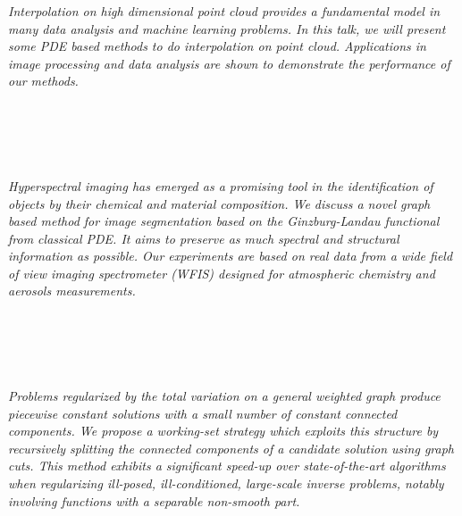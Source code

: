 \begin{multicols}{2}
\\ 
        \\
        \\\\
\\
      \textit{Interpolation on high dimensional point cloud provides a fundamental model in many data analysis and machine learning problems. In this talk, we will present some PDE based methods to do interpolation on point cloud. Applications in image processing and data analysis are shown to demonstrate the performance of our methods.}\\
\\ 
        \\
        \\\\
\\
      \textit{Hyperspectral imaging has emerged as a promising tool in the identification of objects by their chemical and material composition. We discuss a novel graph based method for image segmentation based on the Ginzburg-Landau functional from classical PDE. It aims to preserve as much spectral and structural information as possible. Our experiments are based on real data from a wide field of view imaging spectrometer (WFIS) designed for atmospheric chemistry and aerosols measurements.}\\
\\ 
        \\
        \\\\
\\
      \textit{Problems regularized by the total variation on a general weighted graph produce piecewise constant solutions with a small number of constant connected components. We propose a working-set strategy which exploits this structure by recursively splitting the connected components of a candidate solution using graph cuts. This method exhibits a significant speed-up over state-of-the-art algorithms when regularizing ill-posed, ill-conditioned, large-scale inverse problems, notably involving functions with a separable non-smooth part.}\\
\\ 
        \\
        \\\\
\\
\end{multicols}
